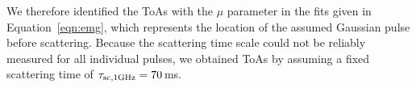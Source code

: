 \documentclass[fleqn,usenatbib]{mnras}
\newcommand{\Eqn}{Equation}
\begin{document}
\begin{figure}
                  \label{fig:stacked_spectra}
\end{figure}

We therefore identified the ToAs with the $\mu$ parameter in the fits given in \Eqn~\ref{eqn:emg}, which represents the location of the assumed Gaussian pulse before scattering.
Because the scattering time scale could not be reliably measured for all individual pulses, we obtained ToAs by assuming a fixed scattering time of $\tau_{\rm sc,1 GHz} = 70$\,ms.

\end{document}
